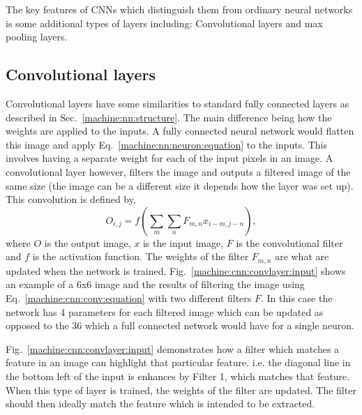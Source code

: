 The key features of \acp{CNN} which distinguish them from ordinary neural networks is some additional types of layers including: Convolutional layers and max pooling layers. 


\subsection{Convolutional layers}

Convolutional layers have some similarities to standard fully connected layers as described in Sec.~\ref{machine:nn:structure}. 
The main difference being how the weights are applied to the inputs.
A fully connected neural network would flatten this image and apply Eq.~\ref{machine:nn:neuron:equation} to the inputs.
This involves having a separate weight for each of the input pixels in an image.
A convolutional layer however, filters the image and outputs a filtered image of the same size (the image can be a different size it depends how the layer was set up).
This convolution is defined by,
\begin{equation}
\label{machine:cnn:conv:equation}
O_{i,j} = f\left( \sum_{m} \sum_{n} F_{m,n}x_{i-m,j-n}\right) ,
\end{equation}
where $O$ is the output image, $x$ is the input image, $F$ is the convolutional filter and $f$ is the activation function.
The weights of the filter $F_{m,n}$ are what are updated when the network is trained.
Fig.~\ref{machine:cnn:convlayer:input} shows an example of a 6x6 image and the results of filtering the image using Eq.~\ref{machine:cnn:conv:equation} with two different filters $F$. 
In this case the network has 4 parameters for each filtered image which can be updated as opposed to the 36 which a full connected network would have for a single neuron.

Fig.~\ref{machine:cnn:convlayer:input} demonstrates how a filter which matches a feature in an image can highlight that particular feature. 
i.e. the diagonal line in the bottom left of the input is enhances by Filter 1, which matches that feature. 
When this type of layer is trained, the weights of the filter are updated. The filter should then ideally match the feature which is intended to be extracted.

